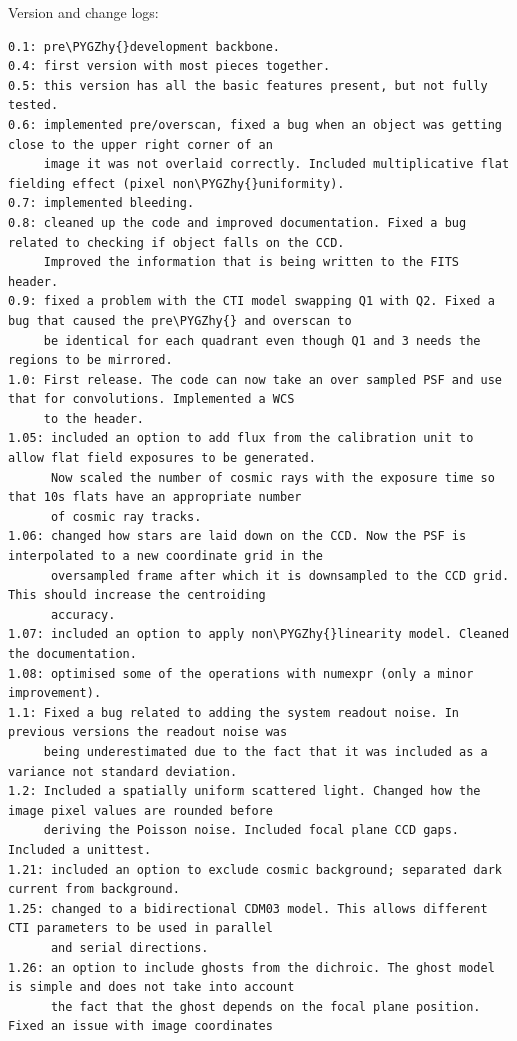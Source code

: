 \documentclass[a4paper,11pt,english]{sphinxmanual}
\def\PYGZhy{\char`\-}
\begin{document}
Version and change logs:

\begin{Verbatim}[commandchars=\\\{\}]
0.1: pre\PYGZhy{}development backbone.
0.4: first version with most pieces together.
0.5: this version has all the basic features present, but not fully tested.
0.6: implemented pre/overscan, fixed a bug when an object was getting close to the upper right corner of an
     image it was not overlaid correctly. Included multiplicative flat fielding effect (pixel non\PYGZhy{}uniformity).
0.7: implemented bleeding.
0.8: cleaned up the code and improved documentation. Fixed a bug related to checking if object falls on the CCD.
     Improved the information that is being written to the FITS header.
0.9: fixed a problem with the CTI model swapping Q1 with Q2. Fixed a bug that caused the pre\PYGZhy{} and overscan to
     be identical for each quadrant even though Q1 and 3 needs the regions to be mirrored.
1.0: First release. The code can now take an over sampled PSF and use that for convolutions. Implemented a WCS
     to the header.
1.05: included an option to add flux from the calibration unit to allow flat field exposures to be generated.
      Now scaled the number of cosmic rays with the exposure time so that 10s flats have an appropriate number
      of cosmic ray tracks.
1.06: changed how stars are laid down on the CCD. Now the PSF is interpolated to a new coordinate grid in the
      oversampled frame after which it is downsampled to the CCD grid. This should increase the centroiding
      accuracy.
1.07: included an option to apply non\PYGZhy{}linearity model. Cleaned the documentation.
1.08: optimised some of the operations with numexpr (only a minor improvement).
1.1: Fixed a bug related to adding the system readout noise. In previous versions the readout noise was
     being underestimated due to the fact that it was included as a variance not standard deviation.
1.2: Included a spatially uniform scattered light. Changed how the image pixel values are rounded before
     deriving the Poisson noise. Included focal plane CCD gaps. Included a unittest.
1.21: included an option to exclude cosmic background; separated dark current from background.
1.25: changed to a bidirectional CDM03 model. This allows different CTI parameters to be used in parallel
      and serial directions.
1.26: an option to include ghosts from the dichroic. The ghost model is simple and does not take into account
      the fact that the ghost depends on the focal plane position. Fixed an issue with image coordinates

\end{Verbatim}
\end{document}
